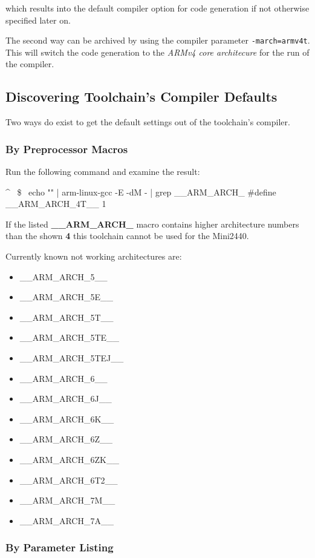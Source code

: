 which results into the default compiler option for code generation if not
otherwise specified later on.

The second way can be archived by using the compiler parameter
\texttt{-march=armv4t}. This will switch the code generation to the
\textit{ARMv4 core architecure} for the run of the compiler.

\subsection{Discovering Toolchain's Compiler Defaults}

Two ways do exist to get the default settings out of the toolchain's compiler.

\subsubsection{By Preprocessor Macros}

Run the following command and examine the result:

\begin{ptxshell}[escapechar=~]{^}
~\$~ echo "" | arm-linux-gcc -E -dM - | grep __ARM_ARCH_
#define __ARM_ARCH_4T__ 1
\end{ptxshell}

If the listed \textbf{__ARM_ARCH_} macro contains higher architecture numbers
than the shown \textbf{4} this toolchain cannot be used for the Mini2440.

Currently known not working architectures are:

\begin{itemize}
	\item __ARM_ARCH_5__
	\item __ARM_ARCH_5E__
	\item __ARM_ARCH_5T__
	\item __ARM_ARCH_5TE__
	\item __ARM_ARCH_5TEJ__
	\item __ARM_ARCH_6__
	\item __ARM_ARCH_6J__
	\item __ARM_ARCH_6K__
	\item __ARM_ARCH_6Z__
	\item __ARM_ARCH_6ZK__
	\item __ARM_ARCH_6T2__
	\item __ARM_ARCH_7M__
	\item __ARM_ARCH_7A__
\end{itemize}

\subsubsection{By Parameter Listing}

